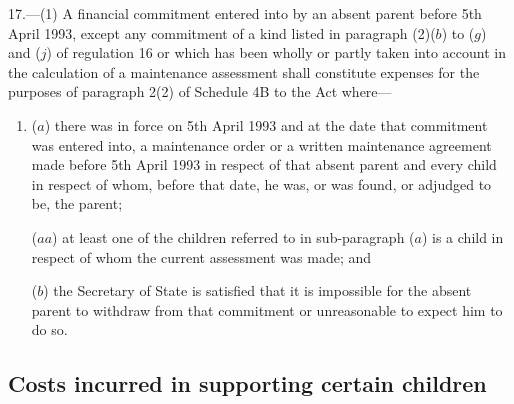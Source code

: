 \documentclass[12pt,a4paper]{article}
\begin{document}
17.—(1) A financial commitment entered into by an absent parent before 5th April 1993, except any commitment of a kind listed in paragraph (2)($b$) to ($g$) and ($j$) of regulation 16 or which has been wholly or partly taken into account in the calculation of a maintenance assessment shall constitute expenses for the purposes of paragraph 2(2) of Schedule 4B to the Act where—
\begin{enumerate}\item[]
($a$) there was in force on 5th April 1993 and at the date that commitment was entered into, 
a maintenance order or a written  %
maintenance agreement made before 5th April 1993 in respect of that absent parent and every child in respect of whom, before that date, he was, or was found, or adjudged to be, the parent; 

($aa$) at least one of the children referred to in sub-paragraph ($a$) is a child in respect of whom the current assessment was made; and

($b$) the Secretary of State is satisfied that it is impossible for the absent
parent to withdraw from that commitment or unreasonable to expect him to do so.
\end{enumerate}

%


\subsection[18. Costs incurred in supporting certain children]{Costs incurred in supporting certain children}
\end{document}
